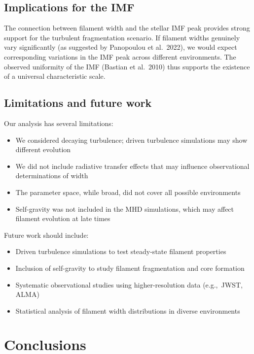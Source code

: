 \documentclass{mnras}
\begin{document}
\subsection{Implications for the IMF}

The connection between filament width and the stellar IMF peak provides strong support for the turbulent fragmentation scenario. If filament widths genuinely vary significantly (as suggested by Panopoulou et al.~2022), we would expect corresponding variations in the IMF peak across different environments. The observed uniformity of the IMF (Bastian et al.~2010) thus supports the existence of a universal characteristic scale.

\subsection{Limitations and future work}

Our analysis has several limitations:
\begin{itemize}
\item We considered decaying turbulence; driven turbulence simulations may show different evolution
\item We did not include radiative transfer effects that may influence observational determinations of width
\item The parameter space, while broad, did not cover all possible environments
\item Self-gravity was not included in the MHD simulations, which may affect filament evolution at late times
\end{itemize}

Future work should include:
\begin{itemize}
\item Driven turbulence simulations to test steady-state filament properties
\item Inclusion of self-gravity to study filament fragmentation and core formation
\item Systematic observational studies using higher-resolution data (e.g.,~JWST, ALMA)
\item Statistical analysis of filament width distributions in diverse environments
\end{itemize}


\section{Conclusions}
\end{document}

